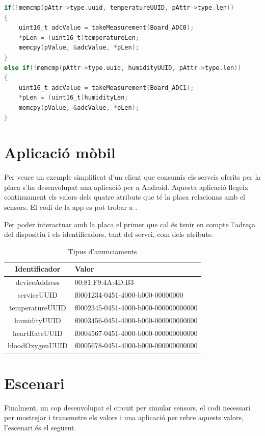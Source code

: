 \begin{lstlisting}[language=C]
  if(!memcmp(pAttr->type.uuid, temperatureUUID, pAttr->type.len))
{
	uint16_t adcValue = takeMeasurement(Board_ADC0);
	*pLen = (uint16_t)temperatureLen;
	memcpy(pValue, &adcValue, *pLen);
}
else if(!memcmp(pAttr->type.uuid, humidityUUID, pAttr->type.len))
{
	uint16_t adcValue = takeMeasurement(Board_ADC1);
	*pLen = (uint16_t)humidityLen;
	memcpy(pValue, &adcValue, *pLen);
}
\end{lstlisting}

\section{Aplicació mòbil}
Per veure un exemple simplificat d'un client que consumis els serveis oferits per la placa s'ha desenvolupat una aplicació per a Android.
Aquesta aplicació llegeix continuament els valors dels quatre atributs que té la placa relacionas amb el sensors.
El codi de la app es pot trobar a \cite{android_repo}.

Per poder interactuar amb la placa el primer que cal és tenir en compte l'adreça del dispositiu i els identificadors, tant del servei, com dels atributs. 

\begin{table}[!h]
	\begin{center}
		\begin{tabular}{|c|l|}
			\hline
			Identificador	&	Valor	\\	\hline
			deviceAddress	&	00:81:F9:4A:4D:B3	\\	\hline
			serviceUUID		&	f0001234-0451-4000-b000-00000000		\\	\hline
			temperatureUUID	&	f0002345-0451-4000-b000-000000000000	\\	\hline
			humidityUUID	&	f0003456-0451-4000-b000-000000000000	\\	\hline
			heartRateUUID	&	f0004567-0451-4000-b000-000000000000	\\	\hline
			bloodOxygenUUID	&	f0005678-0451-4000-b000-000000000000	\\	\hline
		\end{tabular}
	\end{center}
	\caption{Tipus d'anunciaments}
\end{table}


\section{Escenari}
Finalment, un cop desenvolupat el circuit per simular sensors, el codi necessari per mostrejar i transmetre els valors i una aplicació per rebre aquests valors, l'escenari és el següent.

